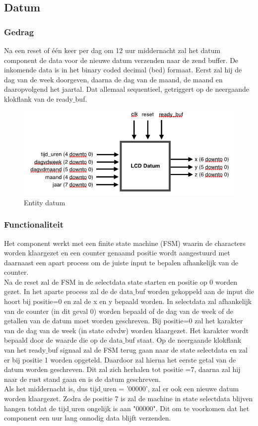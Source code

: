 \subsection{Datum}
\subsubsection{Gedrag}
Na een reset of \'e\'en keer per dag om 12 uur middernacht zal het datum component de data voor de nieuwe datum verzenden naar de zend buffer. De inkomende data is in het binary coded decimal (bcd) formaat. Eerst zal hij de dag van de week doorgeven, daarna de dag van de maand, de maand en daaropvolgend het jaartal. Dat allemaal sequentieel, getriggert op de neergaande klokflank van de ready$\_$buf. 

\begin{figure}
  \centering
     \includegraphics[angle = 0, scale= 0.75]{verslag_schemas/datum_entity.png}
       \caption{Entity datum}
\label{fig:datumentity}
\end{figure}


\subsubsection{Functionaliteit}
Het component werkt met een finite state machine (FSM) waarin de characters worden klaargezet en een counter genaamd positie wordt aangestuurd met daarnaast een apart process om de juiste input te bepalen afhankelijk van de counter. \\
Na de reset zal de FSM in de selectdata state starten en positie op 0 worden gezet. 
In het aparte process zal de de data$\_$buf worden gekoppeld aan de input die hoort bij positie=0 en zal de x en y bepaald worden. 
 In selectdata zal  afhankelijk van de counter (in dit geval 0) worden bepaald of de dag van de week of de getallen van de datum moet worden geschreven. Bij positie=0 zal het karakter van de dag van de week (in state cdvdw) worden klaargezet. Het karakter wordt bepaald door de waarde die op de data$\_$buf staat. Op de neergaande klokflank van het ready$\_$buf signaal zal de FSM terug gaan naar de state selectdata en zal er bij positie 1 worden opgeteld. Daardoor zal hierna het eerste getal van de datum worden geschreven. Dit zal zich herhalen tot positie =7, daarna zal hij naar de rust stand gaan en is de datum geschreven. \\
 Als het middernacht is, dus tijd$\_$uren = '00000', zal er ook een nieuwe datum worden klaargezet. Zodra de positie 7 is zal de machine in state selectdata blijven hangen totdat de tijd$\_$uren ongelijk is aan "00000". Dit om te voorkomen dat het component een uur lang onnodig data blijft verzenden. 


